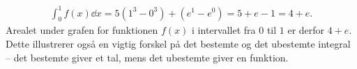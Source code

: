 \begin{example}
%
\begin{align*}
    \int_0^1 f(x) \dd{x} = 5 \left( 1^3 - 0^3 \right) + \left( e^1 - e^0 \right) = 5 + e - 1 = 4 + e.
\end{align*}
%
Arealet under grafen for funktionen $f(x)$ i intervallet fra $0$ til $1$ er derfor $4+e$. Dette illustrerer også en vigtig forskel på det bestemte og det ubestemte integral -- det bestemte giver et tal, mens det ubestemte giver en funktion.
\end{example}